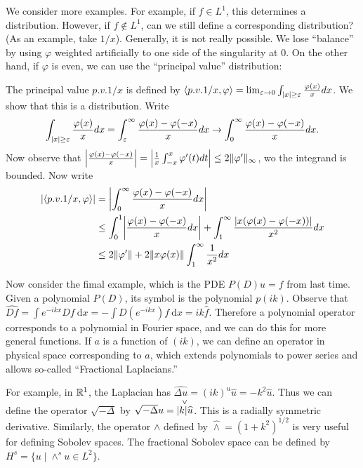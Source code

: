 \documentclass[10pt, twoside]{article}
\renewcommand{\d}{\ \mathrm{d}}
\begin{document}
    We consider more examples. For example, if $f \in L^1$, this determines a distribution. However, if $f \notin L^1$, can we still define a corresponding distribution? (As an example, take $1/x$). Generally, it is not really possible. We lose ``balance'' by using $\varphi$ weighted artificially to one side of the singularity at $0$. On the other hand, if $\varphi$ is even, we can use the ``principal value'' distribution:

    The principal value $p.v.1/x$ is defined by $\gen{p.v.1/x, \varphi} = \lim_{\ep \to 0} \int_{\abs{x} \geq \ep} \frac{\varphi(x)}{x} dx$. We show that this is a distribution. Write 
    \begin{align*}
        \int_{\abs{x} \geq \ep} \frac{\varphi(x)}{x} dx = \int_{\ep}^{\infty} \frac{\varphi(x) - \varphi(-x)}{x} dx \to \int_0^{\infty} \frac{\varphi(x) - \varphi(-x)}{x} dx.
    \end{align*}
    Now observe that $\abs*{\frac{\varphi(x) - \varphi(-x)}{x}} = \abs*{\frac{1}{x} \int_{-x}^x \varphi'(t) dt} \leq 2 \norm{\varphi'}_{\infty}$, wo the integrand is bounded. Now write 
    \begin{align*}
        \abs{\gen{p.v.1/x,\varphi}} &= \abs*{\int_0^{\infty}\frac{\varphi(x) - \varphi(-x)}{x} dx} \\
                                    &\leq \int_0^1 \abs*{\frac{\varphi(x) - \varphi(-x)}{x} dx} + \int_1^{\infty} \frac{\abs{x(\varphi(x) - \varphi(-x))}}{x^2} dx \\
                                    &\leq 2 \norm{\varphi'} + 2 \norm{x \varphi(x)}\int_1^{\infty} \frac{1}{x^2} dx
    \end{align*}

    Now consider the fimal example, which is the PDE $P(D)u = f$ from last time. Given a polynomial $P(D)$, its symbol is the polynomial $p(ik)$. Observe that $\widehat{Df} = \int e^{-ikx} Df \d x = -\int D(e^{-ikx}) f \d x = ik\widehat{f}$. Therefore a polynomial operator corresponds to a polynomial in Fourier space, and we can do this for more general functions. If $a$ is a function of $(ik)$, we can define an operator in physical space corresponding to $a$, which extends polynomials to power series and allows so-called ``Fractional Laplacians.''

    For example, in $\R^1$, the Laplacian has $\widehat{\Delta u} = (ik)^u \widehat{u} = -k^2\widehat{u}$. Thus we can define the operator $\sqrt{-\Delta}$ by $\sqrt{-\Delta} u = \overset{\vee}{\abs{k}\widehat{u}}$. This is a radially symmetric derivative. Similarly, the operator $\land$ defined by $\widehat{\land} = (1+k^2)^{1/2}$ is very useful for defining Sobolev spaces. The fractional Sobolev space can be defined by $H^s = \{ u \mid \land^s u \in L^2 \}$.
    
\end{document}
